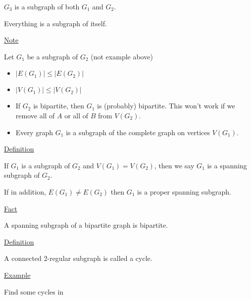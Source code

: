 \documentclass{article}
\begin{document}
$G_3$ is a subgraph of both $G_1$ and $G_2$. 

Everything is a subgraph of itself.

\underline{Note}

Let $G_1$ be a subgraph of $G_2$ (not example above)
\begin{itemize}
    \item $|E(G_1)| \le |E(G_2)|$
    \item $|V(G_1)| \le |V(G_2)|$
    \item If $G_2$ is bipartite, then $G_1$ is (probably) bipartite. This won't work if we remove all of $A$ or all of $B$ from $V(G_2)$.
    \item Every graph $G_1$ is a subgraph of the complete graph on vertices $V(G_1)$.
\end{itemize}

\underline{Definition}

If $G_1$ is a subgraph of $G_2$ and $V(G_1) = V(G_2)$, then we say $G_1$ is a spanning subgraph of $G_2$. 

If in addition, $E(G_1) \ne E(G_2)$ then $G_1$ is a proper spanning subgraph. 

\underline{Fact}

A spanning subgraph of a bipartite graph is bipartite. 

\underline{Definition}

A connected 2-regular subgraph is called a cycle. 

\underline{Example}

Find some cycles in 
\end{document}
